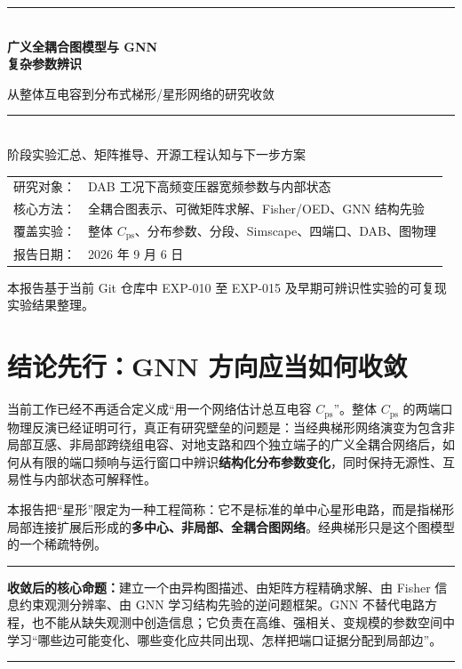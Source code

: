 \documentclass[UTF8,11pt,a4paper]{ctexart}
\newcommand{\Cps}{C_{\mathrm{ps}}}
\newenvironment{keybox}{\begin{center}\begin{minipage}{0.91\textwidth}\color{navy}\hrule\vspace{0.55em}\color{black}}{\vspace{0.55em}\color{navy}\hrule\color{black}\end{minipage}\end{center}}
\begin{document}
\begin{titlepage}
\centering
\vspace*{2.2cm}
{\color{navy}\rule{\textwidth}{1.2pt}}\\[1.1cm]
{\fontsize{26}{34}\selectfont\bfseries 广义全耦合图模型与 GNN\\复杂参数辨识}\par
\vspace{0.65cm}
{\Large 从整体互电容到分布式梯形/星形网络的研究收敛}\par
\vspace{1cm}
{\color{navy}\rule{0.72\textwidth}{0.8pt}}\\[1cm]
{\large 阶段实验汇总、矩阵推导、开源工程认知与下一步方案}\par
\vfill
\begin{tabular}{rl}
研究对象：& DAB 工况下高频变压器宽频参数与内部状态\\
核心方法：& 全耦合图表示、可微矩阵求解、Fisher/OED、GNN 结构先验\\
覆盖实验：& 整体 $\Cps$、分布参数、分段、Simscape、四端口、DAB、图物理\\
报告日期：& 2026 年 9 月 6 日
\end{tabular}
\vfill
{\small 本报告基于当前 Git 仓库中 EXP-010 至 EXP-015 及早期可辨识性实验的可复现实验结果整理。}
\end{titlepage}

\tableofcontents
\clearpage

\section{结论先行：GNN 方向应当如何收敛}

当前工作已经不再适合定义成“用一个网络估计总互电容 $\Cps$”。整体 $\Cps$ 的两端口物理反演已经证明可行，真正有研究壁垒的问题是：当经典梯形网络演变为包含非局部互感、非局部跨绕组电容、对地支路和四个独立端子的广义全耦合网络后，如何从有限的端口频响与运行窗口中辨识\textbf{结构化分布参数变化}，同时保持无源性、互易性与内部状态可解释性。

本报告把“星形”限定为一种工程简称：它不是标准的单中心星形电路，而是指梯形局部连接扩展后形成的\textbf{多中心、非局部、全耦合图网络}。经典梯形只是这个图模型的一个稀疏特例。

\begin{keybox}
\textbf{收敛后的核心命题：}建立一个由异构图描述、由矩阵方程精确求解、由 Fisher 信息约束观测分辨率、由 GNN 学习结构先验的逆问题框架。GNN 不替代电路方程，也不能从缺失观测中创造信息；它负责在高维、强相关、变规模的参数空间中学习“哪些边可能变化、哪些变化应共同出现、怎样把端口证据分配到局部边”。
\end{keybox}
\end{document}

